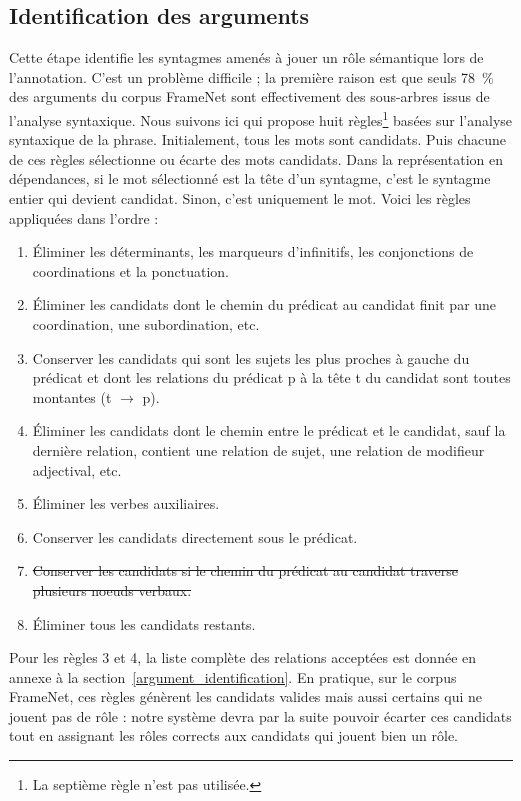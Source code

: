 \subsection{Identification des arguments}
\label{argid}

Cette étape identifie les syntagmes amenés à jouer un rôle sémantique lors de
l'annotation. C'est un problème difficile ; la première raison est que seuls
78~\% des arguments du corpus FrameNet sont effectivement des sous-arbres issus
de l'analyse syntaxique. Nous suivons ici \cite{lang2011unsupervised} qui propose huit
règles\footnote{La septième règle n'est pas utilisée.} basées sur l'analyse
syntaxique de la phrase. Initialement, tous les mots sont candidats. Puis
chacune de ces règles sélectionne ou écarte des mots candidats. Dans la
représentation en dépendances, si le mot sélectionné est la tête d'un syntagme,
c'est le syntagme entier qui devient candidat. Sinon, c'est uniquement le mot.
Voici les règles appliquées dans l'ordre :

\begin{enumerate}
    \item Éliminer les déterminants, les marqueurs d'infinitifs, les conjonctions de coordinations et la ponctuation.
    \item Éliminer les candidats dont le chemin du prédicat au candidat finit par une coordination, une subordination, etc.
    \item Conserver les candidats qui sont les sujets les plus proches à gauche du prédicat et dont les relations du prédicat p à la tête t du candidat sont toutes montantes (t $\rightarrow$ p).
    \item Éliminer les candidats  dont le chemin entre le prédicat et le candidat, sauf la dernière relation, contient une relation de sujet, une relation de modifieur adjectival, etc.
    \item Éliminer les verbes auxiliaires.
    \item Conserver les candidats directement sous le prédicat.
    \item \sout{Conserver les candidats si le chemin du prédicat au candidat traverse plusieurs noeuds verbaux.}
    \item Éliminer tous les candidats restants.
\end{enumerate}

Pour les règles 3 et 4, la liste complète des relations acceptées est donnée en
annexe à la section~\ref{argument_identification}. En pratique, sur le corpus
FrameNet, ces règles génèrent les candidats valides mais aussi certains qui ne
jouent pas de rôle : notre système devra par la suite pouvoir écarter ces
candidats tout en assignant les rôles corrects aux candidats qui jouent bien un
rôle.

